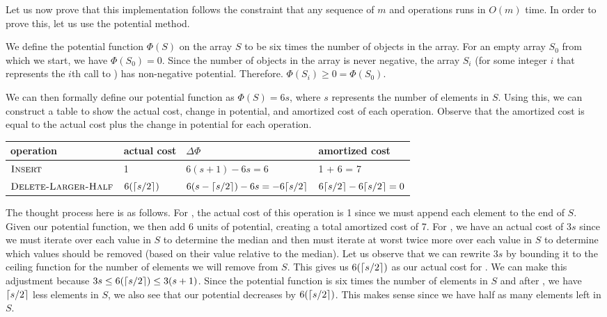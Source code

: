 \documentclass[11pt]{article}
\DeclarePairedDelimiter{\ceil}{\lceil}{\rceil}
\begin{document}
Let us now prove that this implementation follows the constraint that any sequence of $m$  and  operations runs in $O(m)$ time. In order to prove this, let us use the potential method.

We define the potential function $\Phi(S)$ on the array $S$ to be six times the number of objects in the array. For an empty array $S_0$ from which we start, we have $\Phi(S_0) = 0$. Since the number of objects in the array is never negative, the array $S_i$ (for some integer $i$ that represents the $i$th call to ) has non-negative potential. Therefore. $\Phi(S_i) \geq 0 = \Phi(S_0)$.

We can then formally define our potential function as $\Phi(S) = 6s$, where $s$ represents the number of elements in $S$. Using this, we can construct a table to show the actual cost, change in potential, and amortized cost of each operation. Observe that the amortized cost is equal to the actual cost plus the change in potential for each operation.

\begin{table}[H]
\begin{tabular}{l|l|l|l}
operation                   & actual cost & $\Delta \Phi$     & amortized cost \\ \hline
$\textnormal{\scshape Insert}$             & 1                & $6(s+1) - 6s = 6$                             & 1 + 6 = 7                             \\
$\textnormal{\scshape Delete-Larger-Half}$ & $6(\ceil{s/2})$ & $6(s - \ceil{s/2}) - 6s = - 6\ceil{s/2}$ & $6\ceil{s/2} - 6\ceil{s/2} = 0$
\end{tabular}
\end{table}

The thought process here is as follows. For , the actual cost of this operation is 1 since we must append each element to the end of $S$. Given our potential function, we then add 6 units of potential, creating a total amortized cost of 7. For , we have an actual cost of $3s$ since we must iterate over each value in $S$ to determine the median and then must iterate at worst twice more over each value in $S$ to determine which values should be removed (based on their value relative to the median). Let us observe that we can rewrite $3s$ by bounding it to the ceiling function for the number of elements we will remove from $S$. This gives us $6(\ceil{s/2})$ as our actual cost for . We can make this adjustment because $3s \leq 6(\ceil{s/2}) \leq 3(s + 1)$. Since the potential function is six times the number of elements in $S$ and after , we have $\ceil{s/2}$ less elements in $S$, we also see that our potential decreases by $6(\ceil{s/2})$. This makes sense since we have half as many elements left in $S$.
\end{document}
